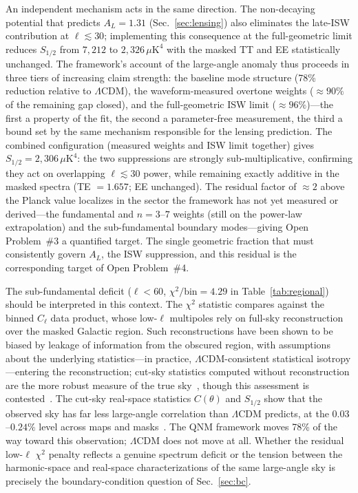 \documentclass[aps,prd,twocolumn,superscriptaddress,showpacs,preprintnumbers,amsmath,amssymb,nofootinbib]{revtex4-2}
\newcommand{\lcdm}{$\Lambda$CDM}
\begin{document}
An independent mechanism acts in the same direction. The non-decaying potential that predicts $A_L = 1.31$ (Sec.~\ref{sec:lensing}) also eliminates the late-ISW contribution at $\ell \lesssim 30$; implementing this consequence at the full-geometric limit reduces $S_{1/2}$ from $7{,}212$ to $2{,}326\,\mu\mathrm{K}^4$ with the masked TT and EE statistically unchanged. The framework's account of the large-angle anomaly thus proceeds in three tiers of increasing claim strength: the baseline mode structure (78\% reduction relative to \lcdm), the waveform-measured overtone weights ($\approx 90\%$ of the remaining gap closed), and the full-geometric ISW limit ($\approx 96\%$)---the first a property of the fit, the second a parameter-free measurement, the third a bound set by the same mechanism responsible for the lensing prediction. The combined configuration (measured weights and ISW limit together) gives $S_{1/2} = 2{,}306\,\mu\mathrm{K}^4$: the two suppressions are strongly sub-multiplicative, confirming they act on overlapping $\ell \lesssim 30$ power, while remaining exactly additive in the masked spectra (TE $= 1.657$; EE unchanged). The residual factor of $\approx 2$ above the Planck value localizes in the sector the framework has not yet measured or derived---the fundamental and $n = 3$--$7$ weights (still on the power-law extrapolation) and the sub-fundamental boundary modes---giving Open Problem~\#3 a quantified target. The single geometric fraction that must consistently govern $A_L$, the ISW suppression, and this residual is the corresponding target of Open Problem~\#4.

The sub-fundamental deficit ($\ell < 60$, $\chi^2/\mathrm{bin} = 4.29$ in Table~\ref{tab:regional}) should be interpreted in this context. The $\chi^2$ statistic compares against the binned $C_\ell$ data product, whose low-$\ell$ multipoles rely on full-sky reconstruction over the masked Galactic region. Such reconstructions have been shown to be biased by leakage of information from the obscured region, with assumptions about the underlying statistics---in practice, \lcdm-consistent statistical isotropy---entering the reconstruction; cut-sky statistics computed without reconstruction are the more robust measure of the true sky~\cite{Copi2011,Copi2015}, though this assessment is contested~\cite{Efstathiou2010,PontzenPeiris2010}. The cut-sky real-space statistics $C(\theta)$ and $S_{1/2}$ show that the observed sky has far less large-angle correlation than \lcdm{} predicts, at the $0.03$--$0.24\%$ level across maps and masks~\cite{Copi2015}. The QNM framework moves 78\% of the way toward this observation; \lcdm{} does not move at all. Whether the residual low-$\ell$ $\chi^2$ penalty reflects a genuine spectrum deficit or the tension between the harmonic-space and real-space characterizations of the same large-angle sky is precisely the boundary-condition question of Sec.~\ref{sec:bc}.
\end{document}
